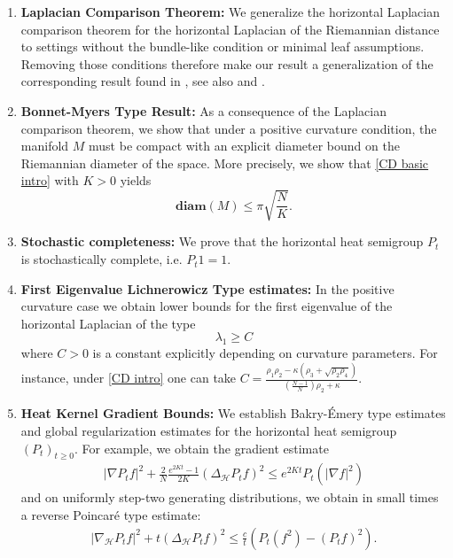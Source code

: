 \documentclass[11pt]{article}
\numberwithin{equation}{section}
\begin{document}
\begin{enumerate}
    \item \textbf{Laplacian Comparison Theorem:} We generalize the horizontal Laplacian comparison theorem for the horizontal Laplacian of the Riemannian distance to settings without the bundle-like condition or minimal leaf assumptions. Removing those conditions therefore make our result a generalization of the corresponding result found in \cite{BauGr}, see also \cite{2025arXiv250913276B} and \cite{MR4167256}.

    \item \textbf{Bonnet-Myers Type Result:} As a consequence of the Laplacian comparison theorem, we show that under a positive curvature condition, the manifold $M$ must be compact with an explicit diameter bound on the Riemannian diameter of the space. More precisely, we show that \eqref{CD basic intro} with $K>0$ yields
    \[
\mathbf{diam} (M ) \le \pi \sqrt{ \frac{N}{ K}}.
\]

    
    \item \textbf{Stochastic completeness:} We prove that the horizontal heat semigroup $P_t$ is stochastically complete, i.e. $P_t1=1$.
    

    
    \item \textbf{First Eigenvalue Lichnerowicz Type estimates:} In the positive curvature case we obtain lower bounds for the first eigenvalue of the horizontal Laplacian of the type
    \[
    \lambda_1 \ge C
    \]
    where $C>0$ is a constant explicitly depending on curvature parameters. For instance, under \eqref{CD intro} one can take $C=\frac{\rho_1 \rho_2 - \kappa (\rho_3 +\sqrt{\rho_2\rho_4})}{\left(\frac{N-1}{N}\right)\rho_2+\kappa }$.

    \item \textbf{Heat Kernel Gradient Bounds:} We establish Bakry-Émery type estimates and global regularization estimates for the horizontal heat semigroup $(P_t)_{t\ge0}$. For example,  we obtain the gradient estimate
    \begin{align}\label{BE intro}
        | \nabla P_{t}f|^2+\frac{2}{N}\frac{e^{2Kt}-1}{2K} (\Delta_{\mathcal{H}} P_{t}f)^2 \le e^{2Kt}P_t (|\nabla f|^2)
        \end{align}
    and on uniformly step-two generating distributions, we obtain in small times a reverse Poincar\'e type estimate:
    \begin{align}\label{poincare intro}
    |\nabla_{\mathcal{H}}P_t f|^2+ t (\Delta_{\mathcal{H}} P_{t}f)^2 \leq \frac{c}{t} \left( P_t(f^2) - (P_t f)^2 \right). 
    \end{align}
\end{enumerate}
\end{document}
